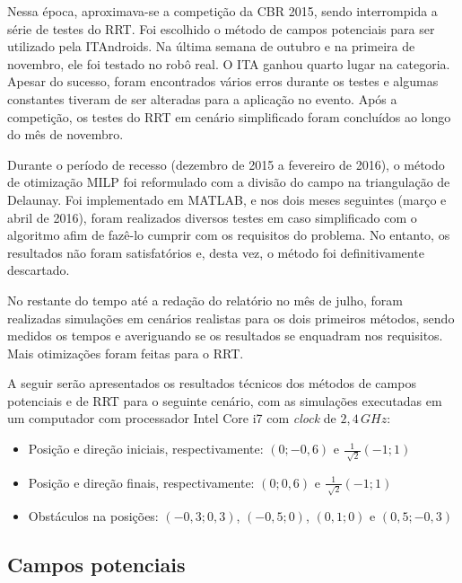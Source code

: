 \documentclass[a4paper,12pt]{article}
\begin{document}
Nessa época, aproximava-se a competição da CBR 2015, sendo interrompida a série de testes do RRT. Foi escolhido o método de campos potenciais para ser utilizado pela ITAndroids. Na última semana de outubro e na primeira de novembro, ele foi testado no robô real. O ITA ganhou quarto lugar na categoria. Apesar do sucesso, foram encontrados vários erros durante os testes e algumas constantes tiveram de ser alteradas para a aplicação no evento. Após a competição, os testes do RRT em cenário simplificado foram concluídos ao longo do mês de novembro.

Durante o período de recesso (dezembro de 2015 a fevereiro de 2016), o método de otimização MILP foi reformulado com a divisão do campo na triangulação de Delaunay. Foi implementado em MATLAB, e nos dois meses seguintes (março e abril de 2016), foram realizados diversos testes em caso simplificado com o algoritmo afim de fazê-lo cumprir com os requisitos do problema. No entanto, os resultados não foram satisfatórios e, desta vez, o método foi definitivamente descartado.

No restante do tempo até a redação do relatório no mês de julho, foram realizadas simulações em cenários realistas para os dois primeiros métodos, sendo medidos os tempos e averiguando se os resultados se enquadram nos requisitos. Mais otimizações foram feitas para o RRT.

A seguir serão apresentados os resultados técnicos dos métodos de campos potenciais e de RRT para o seguinte cenário, com as simulações executadas em um computador com processador Intel Core i7 com \textit{clock} de $2,4 \, GHz$:

\begin{itemize}
\item Posição e direção iniciais, respectivamente: $(0;-0,6)$ e $\frac{1}{\sqrt[]{2}}(-1;1)$
\item Posição e direção finais, respectivamente: $(0;0,6)$ e $\frac{1}{\sqrt[]{2}}(-1;1)$
\item Obstáculos na posições: $(-0,3;0,3)$, $(-0,5;0)$, $(0,1;0)$ e $(0,5;-0,3)$
\end{itemize}
   
\subsection{Campos potenciais}
\end{document}
